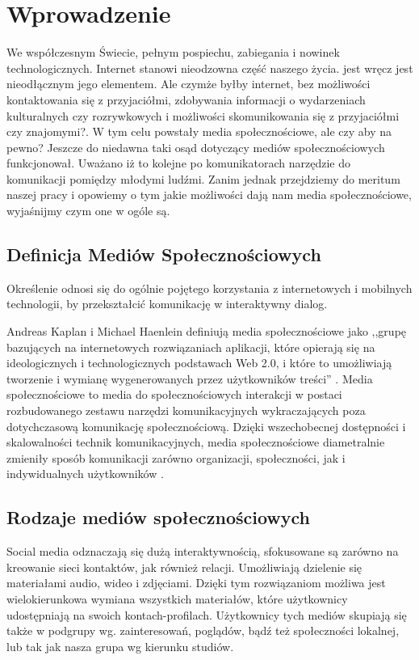 \section{Wprowadzenie}
\label{sec:wprowadzenie}

We współczesnym Świecie, pełnym pospiechu, zabiegania i nowinek technologicznych. Internet stanowi nieodzowna część naszego życia. jest wręcz jest nieodłącznym jego elementem. Ale czymże byłby internet, bez możliwości kontaktowania się z przyjaciółmi, zdobywania informacji o wydarzeniach kulturalnych czy rozrywkowych i możliwości skomunikowania się z przyjaciółmi czy znajomymi?. W tym celu powstały media społecznościowe, ale czy aby na pewno? Jeszcze do niedawna taki osąd dotyczący mediów społecznościowych funkcjonował. Uważano iż to kolejne po komunikatorach narzędzie do komunikacji pomiędzy młodymi ludźmi. Zanim jednak przejdziemy do meritum naszej pracy i opowiemy o tym jakie możliwości dają nam media społecznościowe, wyjaśnijmy czym one w ogóle są.

\subsection{Definicja Mediów Społecznościowych}

\begin{defn} Określenie odnosi się do ogólnie pojętego korzystania z internetowych i mobilnych technologii, by przekształcić komunikację w interaktywny dialog.
\end{defn}

Andreas Kaplan i Michael Haenlein definiują media społecznościowe jako ,,grupę bazujących na internetowych rozwiązaniach aplikacji, które opierają się na ideologicznych i technologicznych podstawach Web 2.0, i które to umożliwiają tworzenie i wymianę wygenerowanych przez użytkowników treści'' \cite{url:wiki-media-spolecznosciowe}. Media społecznościowe to media do społecznościowych interakcji w postaci rozbudowanego zestawu narzędzi komunikacyjnych wykraczających poza dotychczasową komunikację społecznościową. Dzięki wszechobecnej dostępności i skalowalności technik komunikacyjnych, media społecznościowe diametralnie zmieniły sposób komunikacji zarówno organizacji, społeczności, jak i indywidualnych użytkowników \cite{url:wiki-media-spolecznosciowe}.

\subsection{Rodzaje mediów społecznościowych}
Social media odznaczają się dużą interaktywnością, sfokusowane są zarówno na kreowanie sieci kontaktów, jak również relacji. Umożliwiają dzielenie się materiałami audio, wideo i zdjęciami. Dzięki tym rozwiązaniom możliwa jest wielokierunkowa wymiana wszystkich materiałów, które użytkownicy udostępniają na swoich kontach-profilach. Użytkownicy tych mediów skupiają się także w podgrupy wg. zainteresowań, poglądów, bądź też społeczności lokalnej, lub tak jak nasza grupa wg kierunku studiów.\cite{url:kursusability-social-media}

